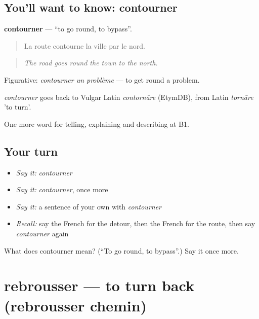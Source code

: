 \subsection*{You'll want to know: contourner}
\textbf{contourner} — \textquotedblleft{}to go round, to bypass\textquotedblright{}.

\begin{quote}
La route contourne la ville par le nord.
\end{quote}

\begin{quote}
\emph{The road goes round the town to the north.}
\end{quote}

Figurative: \emph{contourner un problème} — to get round a problem.

\begin{cousinweb}
\emph{contourner} goes back to Vulgar Latin \emph{contornāre} (EtymDB), from Latin \emph{tornāre} 'to turn'.
\end{cousinweb}

\begin{grammarlens}[title={What you've built}]
One more word for telling, explaining and describing at B1.
\end{grammarlens}

\subsection*{Your turn}
\begin{itemize}
\raggedright
  \item \emph{Say it:} \emph{contourner}
  \item \emph{Say it:} \emph{contourner}, once more
  \item \emph{Say it:} a sentence of your own with \emph{contourner}
  \item \emph{Recall:} say the French for the detour, then the French for the route, then say \emph{contourner} again
\end{itemize}

\begin{tcolorbox}[breakable,colback=teal!4,colframe=teal!35!black,title={Before you move on}]
What does contourner mean? (\textquotedblleft{}To go round, to bypass\textquotedblright{}.) Say it once more.
\end{tcolorbox}
\section[rebrousser]{rebrousser — to turn back (rebrousser chemin)}

